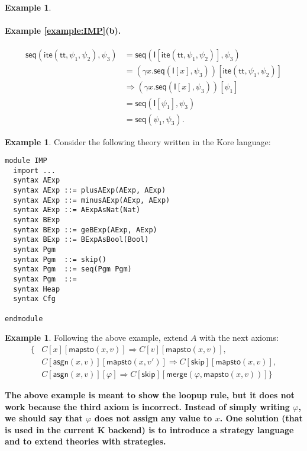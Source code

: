 \documentclass{article}
\newcommand{\comment}[1]
    {\par {\bfseries \color{blue} #1 \par}} %
\newcounter{thmcounter}
\theoremstyle{plain}
\theoremstyle{definition}
\newtheorem{example}[thmcounter]{Example}
\theoremstyle{remark}
\newcommand{\impite}{\mathsf{ite}}
\newcommand{\imptt}{\mathsf{tt}}
\newcommand{\impskip}{\mathsf{skip}}
\newcommand{\impseq}{\mathsf{seq}}
\newcommand{\impasgn}{\mathsf{asgn}}
\newcommand{\impmapsto}{\mathsf{mapsto}}
\newcommand{\impmerge}{\mathsf{merge}}
\newcommand{\I}{\mathsf{I}}
\begin{document}
\begin{example}
\paragraph{Example \ref{example:IMP}(b).} 
	\begin{align*}
	\impseq(\impite(\imptt, \psi_1, \psi_2), \psi_3) 
	&= \impseq(\I[\impite(\imptt, \psi_1, \psi_2)], \psi_3) \\
	&= (\gamma x . \impseq(\I[x], \psi_3))[\impite(\imptt, \psi_1, \psi_2)] \\
	&\Rightarrow (\gamma x . \impseq(\I[x], \psi_3))[\psi_1] \\
	&= \impseq(\I[\psi_1], \psi_3) \\
	&= \impseq(\psi_1, \psi_3).
	\end{align*}
\end{example}

\begin{example}
Consider the following theory written in the Kore language:
\begin{Verbatim}
module IMP
  import ...
  syntax AExp
  syntax AExp ::= plusAExp(AExp, AExp)
  syntax AExp ::= minusAExp(AExp, AExp)
  syntax AExp ::= AExpAsNat(Nat)
  syntax BExp
  syntax BExp ::= geBExp(AExp, AExp)
  syntax BExp ::= BExpAsBool(Bool)
  syntax Pgm
  syntax Pgm  ::= skip()
  syntax Pgm  ::= seq(Pgm Pgm)
  syntax Pgm  ::= 
  syntax Heap
  syntax Cfg
  
endmodule
\end{Verbatim}

\end{example}


\begin{example}
Following the above example, extend $A$ with the next axioms:
\begin{align*}
  \{&C[x][\impmapsto(x, v)] \Rightarrow C[v][\impmapsto(x, v)], \\
    &C[\impasgn(x, v)][\impmapsto(x, v')] \Rightarrow C[\impskip][\impmapsto(x,v)], \\
    &C[\impasgn(x, v)][\varphi] \Rightarrow C[\impskip][\impmerge(\varphi, \impmapsto(x, v))]\}
\end{align*}
\end{example}
\comment{The above example is meant to show the loopup rule, but it does not work because the third axiom is incorrect. Instead of simply writing $\varphi$, we should say that $\varphi$ does not assign any value to $x$. One solution (that is used in the current K backend) is to introduce a strategy language and to extend theories with strategies. }
\end{document}
